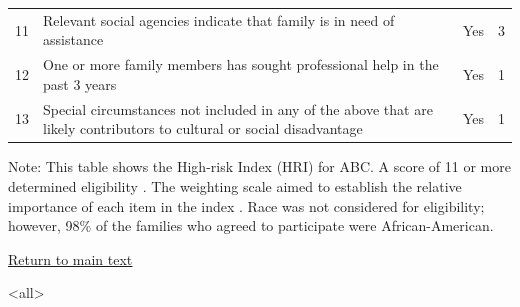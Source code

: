 \documentclass[static]{JJH-Beamer}
\begin{document}
\begin{frame}
\begin{table}[H]
\begin{center}
{\begin{tabular}{c L{8cm} c c}
11	& Relevant social agencies indicate that family is in need of assistance & Yes & 3 \\
12 	& One or more family members has sought professional help in the past 3 years & Yes & 1 \\
13	& Special circumstances not included in any of the above that are likely contributors	to cultural or social disadvantage & Yes & 1 \\
\bottomrule
\end{tabular}
}
\end{center}
\flushleft \tiny
Note: This table shows the High-risk Index (HRI) for ABC. A score of 11 or more determined eligibility \citep{Ramey_Smith_1977_AJMD, Ramey_Campbell_1984_AJMD,Ramey_Campbell_1991_childreninpoverty,Ramey_Campbell_etal_2000_ADS}. The weighting scale aimed to establish the relative importance of each item in the index \citep{Ramey_Smith_1977_AJMD}. Race was not  considered for eligibility; however, 98\% of the families who agreed to participate were African-American\citep{Ramey_Smith_1977_AJMD,Ramey_Campbell_1979_SR}.
\end{table}

\end{frame}

\begin{frame}

\begin{center}
\hyperlink{ret:chocohocochip}{\underline{Return to main text}}
\end{center}

\end{frame}


\mode<all>

\savebox\hiddenbib{\parbox{\textwidth}{}}
\end{document}
